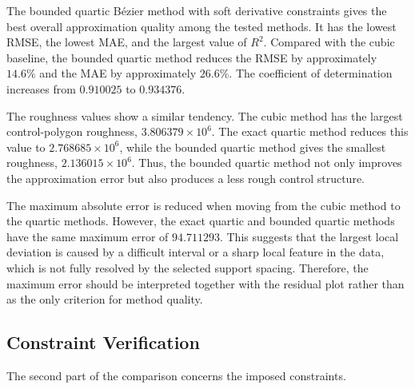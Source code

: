 \documentclass[12pt,a4paper]{article}
\begin{document}
The bounded quartic B\'ezier method with soft derivative constraints gives
the best overall approximation quality among the tested methods. It has the
lowest RMSE, the lowest MAE, and the largest value of \(R^2\). Compared with
the cubic baseline, the bounded quartic method reduces the RMSE by
approximately \(14.6\%\) and the MAE by approximately \(26.6\%\). The
coefficient of determination increases from \(0.910025\) to \(0.934376\).

The roughness values show a similar tendency. The cubic method has the largest
control-polygon roughness, \(3.806379\times 10^6\). The exact quartic method
reduces this value to \(2.768685\times 10^6\), while the bounded quartic
method gives the smallest roughness, \(2.136015\times 10^6\). Thus, the
bounded quartic method not only improves the approximation error but also
produces a less rough control structure.

The maximum absolute error is reduced when moving from the cubic method to
the quartic methods. However, the exact quartic and bounded quartic methods
have the same maximum error of \(94.711293\). This suggests that the largest
local deviation is caused by a difficult interval or a sharp local feature in
the data, which is not fully resolved by the selected support spacing.
Therefore, the maximum error should be interpreted together with the residual
plot rather than as the only criterion for method quality.

\subsection{Constraint Verification}

The second part of the comparison concerns the imposed constraints.

\begin{table}[H]
\centering
\small
{}
\caption{Verification of endpoint interpolation, mean preservation, and lower-bound admissibility. The control lower violation is computed from the B\'ezier control points, while the dense lower violation is computed from the evaluated curve on the dense grid.}
\label{tab:constraint-verification}
\end{table}
\end{document}
